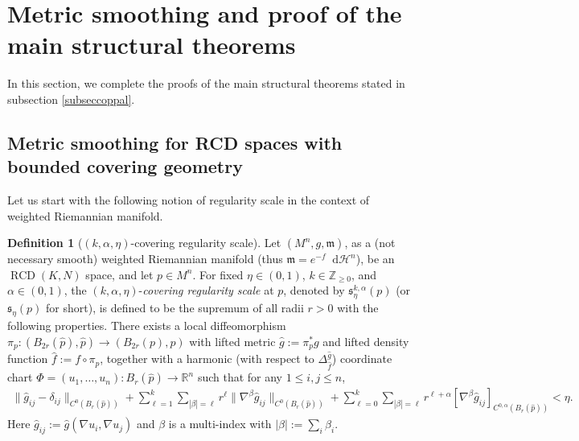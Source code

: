\documentclass[11pt,reqno]{amsart}
\theoremstyle{definition}
\newtheorem{definition}[theorem]{Definition}
\numberwithin{equation}{section}
\newcommand{\dR}{\mathbb{R}}
\newcommand{\fs}{\mathfrak{s}}
\newcommand{\fm}{\mathfrak{m}}
\newcommand{\di}{\mathop{}\!\mathrm{d}}
\newcommand{\meas}{\mathfrak{m}}
\DeclareMathOperator{\RCD}{RCD}
\newcommand{\haus}{\mathscr{H}}
\begin{document}
\section{Metric smoothing and proof of the main structural theorems}\label{seccollapsing}



In this section, we complete the proofs of the main structural theorems stated in subsection \ref{subseccoppal}.



\subsection{Metric smoothing for RCD spaces with bounded covering geometry}



Let us start with the following notion of regularity scale in the context of weighted Riemannian manifold. 
\begin{definition}
[$(k,\alpha, \eta)$-covering  regularity scale]\label{def:covering} Let $(M^n , g, \fm)$, as a (not necessary smooth) weighted Riemannian manifold (thus $\meas=e^{-f}\di \haus^n$), be an $\RCD(K, N)$ space, and let $p \in M^n$. For fixed $\eta \in  (0,1)$, $k\in\mathbb{Z}_{\ge 0}$, and $\alpha\in (0,1)$, the $(k, \alpha, \eta)$-{\it covering regularity scale} at $p$, denoted by $\fs_{\eta}^{k, \alpha}(p)$ (or $\fs_{\eta}(p)$ for short), is defined to be the supremum of all radii $r > 0$ with the following properties. There exists a local diffeomorphism $\pi_p : (B_{2r}(\hat{p}), \hat{p}) \to (B_{2r}(p), p)$ with lifted metric $\hat{g} := \pi_p^* g$ and
lifted density function $\hat{f} := f \circ \pi_p$, together with 
a harmonic (with respect to $\Delta^{\hat{g}}_{\hat{f}}$) coordinate chart $\Phi = (u_1, \ldots, u_n): B_r(\hat{p}) \to \dR^n$ such that for any $1\leq i,j\leq n$,
\begin{align}
\| \hat{g}_{ij} - \delta_{ij}\|_{C^0(B_r(\hat{p}))} + \sum\limits_{\ell = 1}^k \sum\limits_{|\beta| = \ell} r^{\ell}\|\nabla^{\beta} \hat{g}_{ij}\|_{C^0(B_r(\hat{p}))} + \sum\limits_{\ell = 0}^k \sum\limits_{|\beta| = \ell} r^{\ell + \alpha} [\nabla^{\beta} \hat{g}_{ij}]_{C^{0,\alpha}(B_r(\hat{p}))} < \eta.
\end{align}
 Here $\hat{g}_{ij} := \hat{g}(\nabla u_i, \nabla u_j)$ and $\beta$ is a multi-index with $|\beta| := \sum\limits_i \beta_i$. 

\end{definition}
\end{document}

